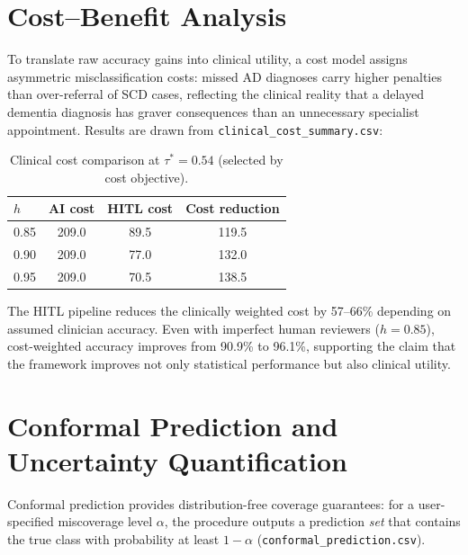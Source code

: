 \documentclass[12pt, a4paper]{report}
\begin{document}
  \section{Cost--Benefit Analysis}
  \label{sec:cost}

  To translate raw accuracy gains into clinical utility, a cost model assigns
  asymmetric misclassification costs: missed AD diagnoses carry higher penalties
  than over-referral of SCD cases, reflecting the clinical reality that a delayed
  dementia diagnosis has graver consequences than an unnecessary specialist
  appointment.  Results are drawn from \texttt{clinical\_cost\_summary.csv}:

  \begin{table}[htbp]
    \centering
    \caption{Clinical cost comparison at $\tau^* = 0.54$ (selected by cost
    objective).}
    \label{tab:cost}
    \begin{tabular}{lSSS}
      \toprule
      {$h$} & {AI cost} & {HITL cost} & {Cost reduction} \\
       & 209.0 & 89.5  & 119.5 \\
      0.90 & 209.0 & 77.0  & 132.0 \\
      0.95 & 209.0 & 70.5  & 138.5 \\
      \bottomrule
    \end{tabular}
  \end{table}

  The HITL pipeline reduces the clinically weighted cost by 57--66\% depending on
  assumed clinician accuracy.  Even with imperfect human reviewers ($h = 0.85$),
  cost-weighted accuracy improves from 90.9\% to 96.1\%, supporting the claim that
  the framework improves not only statistical performance but also clinical utility.

  \section{Conformal Prediction and Uncertainty Quantification}
  \label{sec:conformal}

  Conformal prediction provides distribution-free coverage guarantees: for a
  user-specified miscoverage level $\alpha$, the procedure outputs a prediction
  \emph{set} that contains the true class with probability at least $1 - \alpha$
  (\texttt{conformal\_prediction.csv}).
\end{document}
